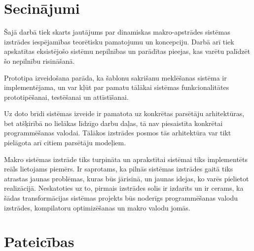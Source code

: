 \documentclass[12pt, a4paper]{article}
\begin{document}
\titullapa



\setcounter{tocdepth}{4}
\tableofcontents















\section*{Secinājumi}
\label{s:conclusions}

Šajā darbā tiek skarts jautājums par dinamiskas makro-apstrādes sistēmas izstrādes iespējamības teorētisku pamatojumu un koncepciju. Darbā arī tiek apskatītas eksistējošo sistēmu nepilnības un parādītas pieejas, kas varētu palīdzēt šo nepilnību risināšanā.

Prototipa izveidošana parāda, ka šablonu sakrišanu meklēšanas sistēma ir implementējama, un var kļūt par pamatu tālākai sistēmas funkcionalitātes prototipēšanai, testēšanai un attīstīšanai.

Uz doto brīdi sistēmas izveide ir pamatota uz konkrētas parsētāju arhitektūras, bet atšķirībā no lielākas līdzīgo darbu daļas, tā nav piesaistīta konkrētai programmēšanas valodai. Tālākos izstrādes posmos tās arhitektūra var tikt pielāgota arī citiem parsētāju modeļiem.

Makro sistēmas izstrāde tiks turpināta un aprakstītai sistēmai tiks implementēts reāls lietojams piemērs. Ir saprotams, ka pilnās sistēmas izstrādes gaitā tiks atrastas jaunas problēmas, kuras būs jārisinā, un jaunas idejas, ko varēs pielietot realizācijā. Neskatoties uz to, pirmais izstrādes solis ir izdarīts un ir cerams, ka šādas transformācijas sistēmas projekts būs noderīgs programmēšanas valodu izstrādes, kompilatoru optimizēšanas un makro valodu jomās.

\section*{Pateicības}
\end{document}
